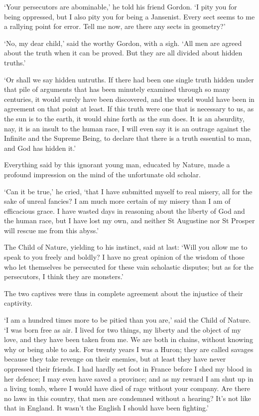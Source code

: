 \documentclass{article}
\begin{document}
\begin{center}
`Your persecutors are abominable,' he told his friend Gordon. `I pity you for being 
oppressed, but I also pity you for being a Jansenist. Every sect seems to me a 
rallying point for error. Tell me now, are there any sects in geometry?' 

`No, my dear child,' said the worthy Gordon, with a sigh. `All men are agreed about 
the truth when it can be proved. But they are all divided about hidden truths.' 

`Or shall we say hidden untruths. If there had been one single truth hidden under 
that pile of arguments that has been minutely examined through so many centuries, 
it would surely have been discovered, and the world would have been in agreement 
on that point at least. If this truth were one that is necessary to us, as the 
sun is to the earth, it would shine forth as the sun does. It is an absurdity, 
nay, it is an insult to the human race, I will even say it is an outrage against 
the Infinite and the Supreme Being, to declare that there is a truth essential 
to man, and God has hidden it.' 

Everything said by this ignorant young man, educated by Nature, made a profound 
impression on the mind of the unfortunate old scholar. 

`Can it be true,' he cried, `that I have submitted myself to real misery, all for 
the sake of unreal fancies? I am much more certain of my misery than I am of efficacious 
grace. I have wasted days in reasoning about the liberty of God and the human race, 
but I have lost my own, and neither St Augustine nor St Prosper will rescue me 
from this abyss.' 

The Child of Nature, yielding to his instinct, said at last: `Will you allow me 
to speak to you freely and boldly? I have no great opinion of the wisdom of those 
who let themselves be persecuted for these vain scholastic disputes; but as for 
the persecutors, I think they are monsters.' 

The two captives were thus in complete agreement about the injustice of their captivity. 

`I am a hundred times more to be pitied than you are,' said the Child of Nature. 
`I was born free as air. I lived for two things, my liberty and the object of my 
love, and they have been taken from me. We are both in chains, without knowing 
why or being able to ask. For twenty years I was a Huron; they are called savages 
because they take revenge on their enemies, but at least they have never oppressed 
their friends. I had hardly set foot in France before I shed my blood in her defence; 
I may even have saved a province; and as my reward I am shut up in a living tomb, 
where I would have died of rage without your company. Are there no laws in this 
country, that men are condemned without a hearing? It's not like that in England. 
It wasn't the English I should have been fighting.' 


\end{center}
\end{document}
